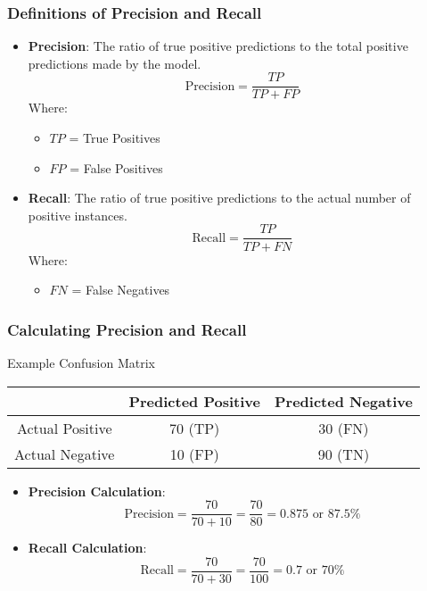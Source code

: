 \documentclass[aspectratio=169]{beamer}
\begin{document}
\begin{frame}[fragile]
    \frametitle{Definitions of Precision and Recall}
    \begin{itemize}
        \item \textbf{Precision}: The ratio of true positive predictions to the total positive predictions made by the model.
        \begin{equation}
        \text{Precision} = \frac{TP}{TP + FP}
        \end{equation}
        Where:
        \begin{itemize}
            \item $TP$ = True Positives
            \item $FP$ = False Positives
        \end{itemize}

        \item \textbf{Recall}: The ratio of true positive predictions to the actual number of positive instances.
        \begin{equation}
        \text{Recall} = \frac{TP}{TP + FN}
        \end{equation}
        Where:
        \begin{itemize}
            \item $FN$ = False Negatives
        \end{itemize}
    \end{itemize}
\end{frame}

\begin{frame}[fragile]
    \frametitle{Calculating Precision and Recall}
    \begin{block}{Example Confusion Matrix}
        \begin{center}
            \begin{tabular}{|c|c|c|}
                \hline
                & Predicted Positive & Predicted Negative \\
                \hline
                Actual Positive & 70 (TP) & 30 (FN) \\
                \hline
                Actual Negative & 10 (FP) & 90 (TN) \\
                \hline
            \end{tabular}
        \end{center}
    \end{block}

    \begin{itemize}
        \item \textbf{Precision Calculation}: 
        \begin{equation}
        \text{Precision} = \frac{70}{70 + 10} = \frac{70}{80} = 0.875 \text{ or } 87.5\%
        \end{equation}

        \item \textbf{Recall Calculation}: 
        \begin{equation}
        \text{Recall} = \frac{70}{70 + 30} = \frac{70}{100} = 0.7 \text{ or } 70\%
        \end{equation}
    \end{itemize}
\end{frame}
\end{document}
